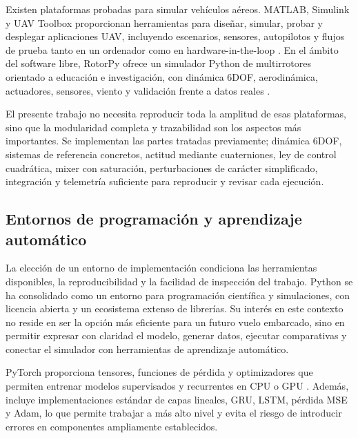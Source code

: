 Existen plataformas probadas para simular vehículos aéreos. MATLAB, Simulink y
UAV Toolbox proporcionan herramientas para diseñar, simular, probar y desplegar
aplicaciones UAV, incluyendo escenarios, sensores, autopilotos y flujos de
prueba tanto en un ordenador como en hardware-in-the-loop \cite{mathworksUAVToolbox}.
En el ámbito del software libre, RotorPy ofrece un simulador Python de multirrotores 
orientado a educación e investigación, con dinámica 6DOF, aerodinámica, actuadores,
sensores, viento y validación frente a datos reales \cite{folk2023rotorpy}.

El presente trabajo no necesita reproducir toda la amplitud de esas
plataformas, sino que la modularidad completa y trazabilidad son los aspectos
más importantes. Se implementan las partes tratadas previamente; dinámica 6DOF,
sistemas de referencia concretos, actitud mediante cuaterniones, ley de control
cuadrática, mixer con saturación, perturbaciones de carácter simplificado, integración
y telemetría suficiente para reproducir y revisar cada ejecución.

\subsection{Entornos de programación y aprendizaje automático}

La elección de un entorno de implementación condiciona las herramientas disponibles,
la reproducibilidad y la facilidad de inspección del trabajo. Python se ha 
consolidado como un entorno para programación científica y simulaciones, con licencia
abierta y un ecosistema extenso de librerías. Su interés en este contexto no
reside en ser la opción más eficiente para un futuro vuelo embarcado, sino en permitir
expresar con claridad el modelo, generar datos, ejecutar comparativas y conectar
el simulador con herramientas de aprendizaje automático.

PyTorch proporciona tensores, funciones de pérdida y optimizadores que permiten entrenar 
modelos supervisados y recurrentes en CPU o GPU \cite{pytorchDocs}. Además, incluye 
implementaciones estándar de capas lineales, GRU, LSTM, pérdida MSE y Adam, lo que permite
trabajar a más alto nivel y evita el riesgo de introducir errores en componentes
ampliamente establecidos.

